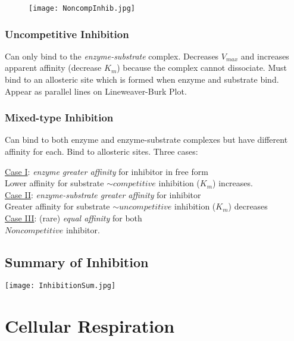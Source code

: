 \documentclass[../Bio_chemistryReview.tex]{subfiles}
\begin{document}
\begin{figure}[h]
  \centering
  \texttt{[image: NoncompInhib.jpg]}
\end{figure}

\subsubsection{Uncompetitive Inhibition}

Can only bind to the \emph{enzyme-substrate} complex. Decreases $ V_{max} $ and
increases apparent affinity (decrease $ K_{m} $) because the complex cannot
dissociate. Must bind to an allosteric site which is formed when enzyme and
substrate bind. Appear as parallel lines on Lineweaver-Burk Plot. 

\subsubsection{Mixed-type Inhibition\supddag}

Can bind to both enzyme and enzyme-substrate complexes but have different
affinity for each. Bind to allosteric sites. Three cases: 
\begin{infobox}
  \underline{Case I}: \emph{enzyme greater affinity} for inhibitor in free
  form\\
  Lower affinity for substrate $ \boxed{ \sim  competitive}$ inhibition
  ($ K_{m} $) increases.\\
  \underline{Case II}: \emph{enzyme-substrate greater affinity} for inhibitor\\
  Greater affinity for substrate  $\boxed{\sim  uncompetitive}$ inhibition ($
  K_{m} $) decreases\\
  \underline{Case III}: (rare) \emph{equal affinity} for both\\
  $ \boxed{Noncompetitive} $ inhibitor.
\end{infobox}

\subsection{Summary of Inhibition}

\begin{center}
  \texttt{[image: InhibitionSum.jpg]}
\end{center}

\section{Cellular Respiration}
\end{document}
